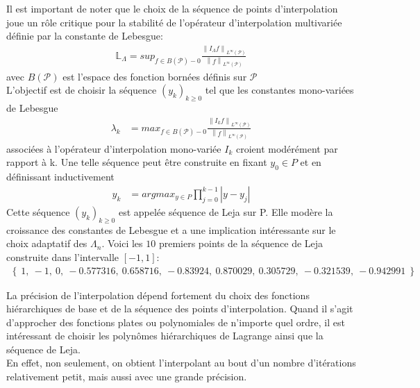 \vspace{0.5cm}

Il est important de noter que le choix de la séquence de points d'interpolation joue un rôle critique pour la stabilité de l'opérateur d'interpolation multivariée définie par la constante de Lebesgue:
\begin{align}
		\mathbb{L}_{\Lambda} = sup_{f \in B(\mathcal{P})-{0}} \frac{\left \| I_{\Lambda}f \right \|_{L^{\infty}(\mathcal{P})}}{\left \|f \right \|_{L^{\infty}(\mathcal{P})}} \nonumber
\end{align}
avec $B(\mathcal{P})$ est l'espace des fonction bornées définis sur $\mathcal{P}$\\
L'objectif est de choisir la séquence $(y_k)_{k \geq 0}$ tel que les constantes mono-variées de Lebesgue
\begin{align}
		\lambda_k & = max_{f \in B(\mathcal{P})-{0}} \frac{\left \| I_k f \right \|_{L^{\infty}(\mathcal{P})}}{\left \|f \right \|_{L^{\infty}(\mathcal{P})}} \nonumber
\end{align}
associées à l'opérateur d'interpolation mono-variée $I_k$ croient modérément par rapport à k. Une telle séquence peut être construite en fixant $y_0 \in P$ et en définissant inductivement
\begin{align}
		y_k & = argmax_{y \in P} \prod_{j=0}^{k-1} \left | y - y_j \right | \nonumber
\end{align}
Cette séquence $(y_k)_{k \geq 0}$ est appelée séquence de Leja \cite{Leja} sur P. Elle modère la croissance des constantes de Lebesgue
et a une implication intéressante sur le choix adaptatif des $\Lambda_n$. Voici les $10$ premiers points de la séquence de Leja construite dans l'intervalle $\left [ -1, 1 \right ]$:
\begin{align}
\left \{\ 1,\ -1,\ 0,\ -0.577316,\ 0.658716,\ -0.83924,\ 0.870029,\ 0.305729,\ -0.321539,\ -0.942991\ \right \} \nonumber
\end{align}

\hspace{0.5cm} La précision de l'interpolation dépend fortement du choix des fonctions hiérarchiques de base et de la séquence des points d'interpolation. Quand il s'agit d'approcher des fonctions plates ou polynomiales de n'importe quel ordre, il est intéressant de choisir les polynômes hiérarchiques de Lagrange ainsi que la séquence de Leja.\\
En effet, non seulement, on obtient l'interpolant au bout d'un nombre d'itérations relativement petit, mais aussi avec une grande précision.

